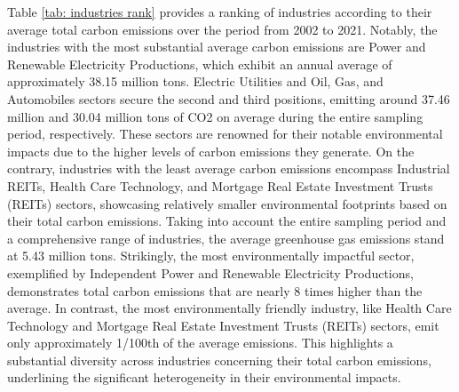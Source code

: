 \documentclass[12pt]{article}
\begin{document}
Table \ref{tab: industries rank} provides a ranking of industries according to their average total carbon emissions over the period from 2002 to 2021. Notably, the industries with the most substantial average carbon emissions are Power and Renewable Electricity Productions, which exhibit an annual average of approximately 38.15 million tons. Electric Utilities and Oil, Gas, and Automobiles sectors secure the second and third positions, emitting around 37.46 million and 30.04 million tons of CO2 on average during the entire sampling period, respectively. These sectors are renowned for their notable environmental impacts due to the higher levels of carbon emissions they generate. On the contrary, industries with the least average carbon emissions encompass Industrial REITs, Health Care Technology, and Mortgage Real Estate Investment Trusts (REITs) sectors, showcasing relatively smaller environmental footprints based on their total carbon emissions. Taking into account the entire sampling period and a comprehensive range of industries, the average greenhouse gas emissions stand at 5.43 million tons. Strikingly, the most environmentally impactful sector, exemplified by Independent Power and Renewable Electricity Productions, demonstrates total carbon emissions that are nearly 8 times higher than the average. In contrast, the most environmentally friendly industry, like Health Care Technology and Mortgage Real Estate Investment Trusts (REITs) sectors, emit only approximately 1/100th of the average emissions. This highlights a substantial diversity across industries concerning their total carbon emissions, underlining the significant heterogeneity in their environmental impacts.
\end{document}

